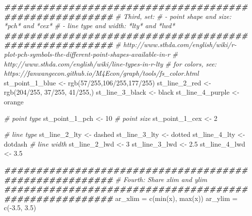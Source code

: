 \documentclass[
]{book}
\newenvironment{Shaded}{\begin{snugshade}}{\end{snugshade}}
\newcommand{\CommentTok}[1]{\textcolor[rgb]{0.56,0.35,0.01}{\textit{#1}}}
\newcommand{\DecValTok}[1]{\textcolor[rgb]{0.00,0.00,0.81}{#1}}
\newcommand{\DocumentationTok}[1]{\textcolor[rgb]{0.56,0.35,0.01}{\textbf{\textit{#1}}}}
\newcommand{\FloatTok}[1]{\textcolor[rgb]{0.00,0.00,0.81}{#1}}
\newcommand{\FunctionTok}[1]{\textcolor[rgb]{0.00,0.00,0.00}{#1}}
\newcommand{\NormalTok}[1]{#1}
\newcommand{\OtherTok}[1]{\textcolor[rgb]{0.56,0.35,0.01}{#1}}
\newcommand{\SpecialCharTok}[1]{\textcolor[rgb]{0.00,0.00,0.00}{#1}}
\newcommand{\StringTok}[1]{\textcolor[rgb]{0.31,0.60,0.02}{#1}}
\begin{document}
\begin{Shaded}
\begin{Highlighting}[]
\DocumentationTok{\#\#\#\#\#\#\#\#\#\#\#\#\#\#\#\#\#\#\#\#\#\#\#\#\#\#\#\#\#\#\#\#\#\#\#\#\#\#\#\#\#\#\#\#\#\#\#\#\#\#\#\#\#\#\#}
\CommentTok{\# Third, set:}
\CommentTok{\# {-} point shape and size: *pch* and *cex*}
\CommentTok{\# {-} line type and width: *lty* and *lwd*}
\DocumentationTok{\#\#\#\#\#\#\#\#\#\#\#\#\#\#\#\#\#\#\#\#\#\#\#\#\#\#\#\#\#\#\#\#\#\#\#\#\#\#\#\#\#\#\#\#\#\#\#\#\#\#\#\#\#\#\#}
\CommentTok{\# http://www.sthda.com/english/wiki/r{-}plot{-}pch{-}symbols{-}the{-}different{-}point{-}shapes{-}available{-}in{-}r}
\CommentTok{\# http://www.sthda.com/english/wiki/line{-}types{-}in{-}r{-}lty}
\CommentTok{\# for colors, see: https://fanwangecon.github.io/M4Econ/graph/tools/fs\_color.html}
\NormalTok{st\_point\_1\_blue }\OtherTok{\textless{}{-}} \FunctionTok{rgb}\NormalTok{(}\DecValTok{57}\SpecialCharTok{/}\DecValTok{255}\NormalTok{,}\DecValTok{106}\SpecialCharTok{/}\DecValTok{255}\NormalTok{,}\DecValTok{177}\SpecialCharTok{/}\DecValTok{255}\NormalTok{)}
\NormalTok{st\_line\_2\_red }\OtherTok{\textless{}{-}} \FunctionTok{rgb}\NormalTok{(}\DecValTok{204}\SpecialCharTok{/}\DecValTok{255}\NormalTok{, }\DecValTok{37}\SpecialCharTok{/}\DecValTok{255}\NormalTok{, }\DecValTok{41}\SpecialCharTok{/}\DecValTok{255}\NormalTok{,)}
\NormalTok{st\_line\_3\_black }\OtherTok{\textless{}{-}} \StringTok{\textquotesingle{}black\textquotesingle{}}
\NormalTok{st\_line\_4\_purple }\OtherTok{\textless{}{-}} \StringTok{\textquotesingle{}orange\textquotesingle{}}

\CommentTok{\# point type}
\NormalTok{st\_point\_1\_pch }\OtherTok{\textless{}{-}} \DecValTok{10}
\CommentTok{\# point size}
\NormalTok{st\_point\_1\_cex }\OtherTok{\textless{}{-}} \DecValTok{2}

\CommentTok{\# line type}
\NormalTok{st\_line\_2\_lty }\OtherTok{\textless{}{-}} \StringTok{\textquotesingle{}dashed\textquotesingle{}}
\NormalTok{st\_line\_3\_lty }\OtherTok{\textless{}{-}} \StringTok{\textquotesingle{}dotted\textquotesingle{}}
\NormalTok{st\_line\_4\_lty }\OtherTok{\textless{}{-}} \StringTok{\textquotesingle{}dotdash\textquotesingle{}}
\CommentTok{\# line width}
\NormalTok{st\_line\_2\_lwd }\OtherTok{\textless{}{-}} \DecValTok{3}
\NormalTok{st\_line\_3\_lwd }\OtherTok{\textless{}{-}} \FloatTok{2.5}
\NormalTok{st\_line\_4\_lwd }\OtherTok{\textless{}{-}} \FloatTok{3.5}

\DocumentationTok{\#\#\#\#\#\#\#\#\#\#\#\#\#\#\#\#\#\#\#\#\#\#\#\#\#\#\#\#\#\#\#\#\#\#\#\#\#\#\#\#\#\#\#\#\#\#\#\#\#\#\#\#\#\#\#}
\CommentTok{\# Fourth: Share xlim and ylim}
\DocumentationTok{\#\#\#\#\#\#\#\#\#\#\#\#\#\#\#\#\#\#\#\#\#\#\#\#\#\#\#\#\#\#\#\#\#\#\#\#\#\#\#\#\#\#\#\#\#\#\#\#\#\#\#\#\#\#\#}
\NormalTok{ar\_xlim }\OtherTok{=} \FunctionTok{c}\NormalTok{(}\FunctionTok{min}\NormalTok{(x), }\FunctionTok{max}\NormalTok{(x))}
\NormalTok{ar\_ylim }\OtherTok{=} \FunctionTok{c}\NormalTok{(}\SpecialCharTok{{-}}\FloatTok{3.5}\NormalTok{, }\FloatTok{3.5}\NormalTok{)}


\end{Highlighting}
\end{Shaded}
\end{document}
